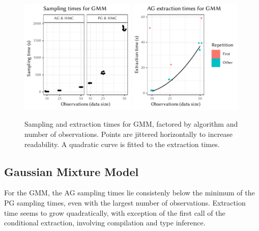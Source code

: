 \newcommand{\leftplotcaption}[1]{%
  Sampling and extraction times for #1, factored by algorithm and number
  of observations.  Points are jittered horizontally to increase readability.  A quadratic curve is
  fitted to the extraction times.
}
\newcommand{\rightplotcaption}[1]{%
  Diagnostics, factored by algorithm, number of observations, and a selection of model parameters.
  \(\widehat{\mathrm{R}}\) and ESS point estimates are jittered horizontally for better readability.
  For chain plots and autocorrelation, the first chain of the respective combination has been used.
}

\begin{figure}[t!]
  \centering
  \includegraphics[width=0.49\textwidth]{figures/GMM-sampling_times}
  \includegraphics[width=0.49\textwidth]{figures/GMM-compile_times}
  \caption{\leftplotcaption{GMM}}
  \label{fig:plots-gmm}
\end{figure}

\subsection*{Gaussian Mixture Model}

For the GMM, the AG sampling times lie consistenly below the minimum of the PG sampling times, even
with the largest number of observations.  Extraction time seems to grow quadratically, with
exception of the first call of the conditional extraction, involving compilation and type
inference.

